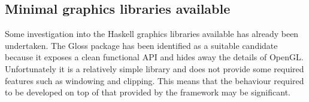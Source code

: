 \subsection{Minimal graphics libraries available}

Some investigation into the Haskell graphics libraries available has already been undertaken.
The Gloss package has been identified as a suitable candidate because it exposes a clean
functional API and hides away the details of OpenGL. Unfortunately it is a relatively simple
library and does not provide some required features such as windowing and clipping.
This means that the behaviour required to be developed on top of that provided by the framework may be significant.
